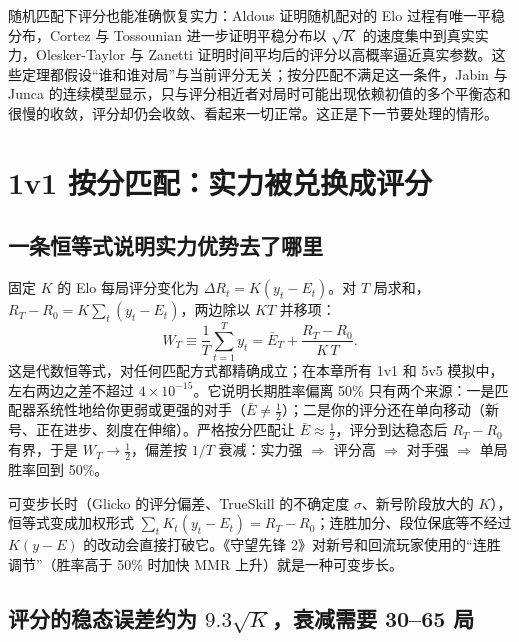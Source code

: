 随机匹配下评分也能准确恢复实力：Aldous 证明随机配对的 Elo 过程有唯一平稳分布\cite{aldous2017elo}\tagLit，Cortez 与 Tossounian 进一步证明平稳分布以 $\sqrt K$ 的速度集中到真实实力\cite{cortez2024convergence}\tagLit，Olesker-Taylor 与 Zanetti 证明时间平均后的评分以高概率逼近真实参数\cite{oleskertaylor2024analysis}\tagLit。这些定理都假设“谁和谁对局”与当前评分无关；按分匹配不满足这一条件，Jabin 与 Junca 的连续模型显示，只与评分相近者对局时可能出现依赖初值的多个平衡态和很慢的收敛，评分却仍会收敛、看起来一切正常\cite{jabin2015continuous}\tagLit。这正是下一节要处理的情形。

\section{1v1 按分匹配：实力被兑换成评分}
\label{sec:ch2-sbmm}

\subsection{一条恒等式说明实力优势去了哪里}
\label{sec:ch2-identity}

固定 $K$ 的 Elo 每局评分变化为 $\Delta R_t=K(y_t-E_t)$。对 $T$ 局求和，$R_T-R_0=K\sum_t(y_t-E_t)$，两边除以 $KT$ 并移项：
\begin{equation}
  W_T\equiv\frac1T\sum_{t=1}^T y_t=\bar E_T+\frac{R_T-R_0}{K\,T}.
  \label{eq:ch2-identity}
\end{equation}
这是代数恒等式，对任何匹配方式都精确成立；在本章所有 1v1 和 5v5 模拟中，左右两边之差不超过 $4\times10^{-15}$\tagOwn。它说明长期胜率偏离 50\% 只有两个来源：一是匹配器系统性地给你更弱或更强的对手（$\bar E\ne\tfrac12$）；二是你的评分还在单向移动（新号、正在进步、刻度在伸缩）。严格按分匹配让 $\bar E\approx\tfrac12$，评分到达稳态后 $R_T-R_0$ 有界，于是 $W_T\to\tfrac12$，偏差按 $1/T$ 衰减：实力强 $\Rightarrow$ 评分高 $\Rightarrow$ 对手强 $\Rightarrow$ 单局胜率回到 50\%。

可变步长时（Glicko 的评分偏差、TrueSkill 的不确定度 $\sigma$\cite{herbrich2006trueskill}、新号阶段放大的 $K$），恒等式变成加权形式 $\sum_tK_t(y_t-E_t)=R_T-R_0$；连胜加分、段位保底等不经过 $K(y-E)$ 的改动会直接打破它。《守望先锋 2》对新号和回流玩家使用的“连胜调节”（胜率高于 50\% 时加快 MMR 上升）就是一种可变步长\cite{blizzard2022overwatch}\tagOff。

\subsection{评分的稳态误差约为 $9.3\sqrt K$，衰减需要 30–65 局}
\label{sec:ch2-sbmm-error}

